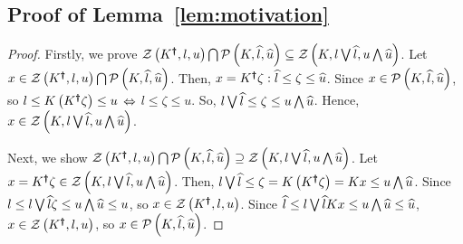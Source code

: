 
%
\subsection*{Proof of Lemma~\ref{lem:motivation}}
\begin{proof}
Firstly, we prove $\mathcal{Z}\left(K^{\bm{\dagger}},l,u\right) \bigcap
\mathcal{P}\left(K,\widehat{l},\widehat{u}\right) \subseteq \mathcal{Z}\left(K,l\bigvee
  \widehat{l},u\bigwedge \widehat{u}\right)$.  Let $x\in\mathcal{Z}\left(K^{\bm{\dagger}},l,u\right) \bigcap
\mathcal{P}\left(K,\widehat{l},\widehat{u}\right)$.  Then, $x=K^{\bm{\dagger}}\zeta:
\widehat{l}\leq\zeta\leq \widehat{u}$.  Since $x\in\mathcal{P}\left(K,\widehat{l},\widehat{u}\right)$, so
$l\leq K\left(K^{\bm{\dagger}}\zeta\right)\leq u$ $\Leftrightarrow$ $l\leq \zeta\leq u$.  So,
$l\bigvee \widehat{l}\leq \zeta\leq u\bigwedge\widehat{u}$.  Hence, $x\in\mathcal{Z}\left(K,l\bigvee
  \widehat{l},u\bigwedge \widehat{u}\right)$.

Next, we show $\mathcal{Z}\left(K^{\bm{\dagger}},l,u\right) \bigcap \mathcal{P}\left(K,\widehat{l},\widehat{u}\right)
\supseteq \mathcal{Z}\left(K,l\bigvee \widehat{l},u\bigwedge \widehat{u}\right)$. Let
$x=K^{\bm{\dagger}}\zeta\in\mathcal{Z}\left(K,l\bigvee \widehat{l},u\bigwedge \widehat{u}\right)$.
Then, $l\bigvee\widehat{l}\leq \zeta = K\left(K^{\bm{\dagger}}\zeta\right)=Kx\leq
u\bigwedge\widehat{u}$.  Since $l\leq l\bigvee\widehat{l} \zeta\leq u\bigwedge
\widehat{u}\leq u$, so $x\in \mathcal{Z}\left(K^{\bm{\dagger}},l,u\right)$.  Since $\widehat{l}\leq
l\bigvee\widehat{l} Kx\leq u\bigwedge \widehat{u}\leq \widehat{u}$, $x\in
\mathcal{Z}\left(K^{\bm{\dagger}},l,u\right)$, so $x\in\mathcal{P}\left(K,\widehat{l},\widehat{u}\right)$.
\end{proof}

